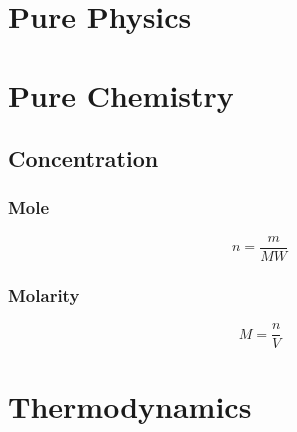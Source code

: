\documentclass[a4paper]{report}
\begin{document}
\chapter{Pure Physics}

\chapter{Pure Chemistry}

  \begin{multicols}{2}

    \section{Concentration}

        \subsection{Mole} 
        $$ n = \frac{m}{MW} $$

        \subsection{Molarity}
        $$ M=\frac{n}{V} $$

  \end{multicols}


\chapter{Thermodynamics}
\end{document}
